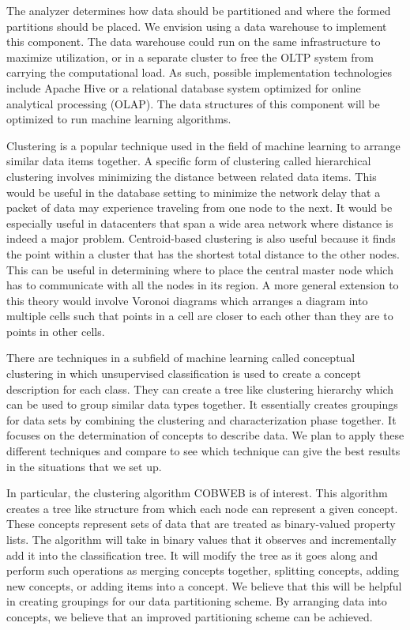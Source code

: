 \documentclass[10pt,final,journal]{IEEEtran}
\begin{document}
The analyzer determines how data should be partitioned and where the formed partitions should be placed. We envision using a data warehouse to implement this component. The data warehouse could run on the same infrastructure to maximize utilization, or in a separate cluster to free the OLTP system from carrying the computational load. As such, possible implementation technologies include Apache Hive or a relational database system optimized for online analytical processing (OLAP). The data structures of this component will be optimized to run machine learning algorithms.

Clustering is a popular technique used in the field of machine learning to arrange similar data items together.  A specific form of clustering called hierarchical clustering involves minimizing the distance between related data items.  This would be useful in the database setting to minimize the network delay that a packet of data may experience traveling from one node to the next.  It would be especially useful in datacenters that span a wide area network where distance is indeed a major problem.  Centroid-based clustering is also useful because it finds the point within a cluster that has the shortest total distance to the other nodes.  This can be useful in determining where to place the central master node which has to communicate with all the nodes in its region.  A more general extension to this theory would involve Voronoi diagrams which arranges a diagram into multiple cells such that points in a cell are closer to each other than they are to points in other cells.

There are techniques in a subfield of machine learning called conceptual clustering in which unsupervised classification is used to create a concept description for each class. They can create a tree like clustering hierarchy which can be used to group similar data types together. It essentially creates groupings for data sets by combining the clustering and characterization phase together. It focuses on the determination of concepts to describe data. We plan to apply these different techniques and compare to see which technique can give the best results in the situations that we set up.

In particular, the clustering algorithm COBWEB is of interest. This algorithm creates a tree like structure from which each node can represent a given concept. These concepts represent sets of data that are treated as binary-valued property lists. The algorithm will take in binary values that it observes and incrementally add it into the classification tree. It will modify the tree as it goes along and perform such operations as merging concepts together, splitting concepts, adding new concepts, or adding items into a concept. We believe that this will be helpful in creating groupings for our data partitioning scheme. By arranging data into concepts, we believe that an improved partitioning scheme can be achieved.
\end{document}
